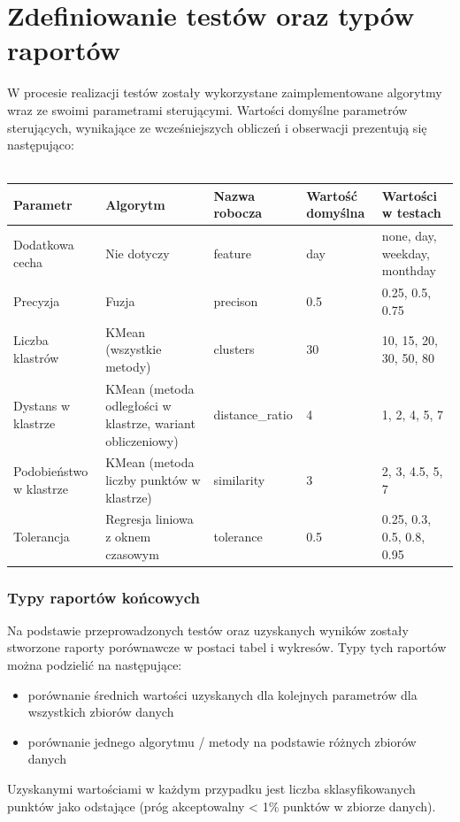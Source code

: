 \documentclass[eng,printmode]{mgr}
\begin{document}
\section{Zdefiniowanie testów oraz typów raportów}
W procesie realizacji testów zostały wykorzystane zaimplementowane algorytmy wraz ze swoimi parametrami sterującymi. Wartości domyślne parametrów sterujących, wynikające ze wcześniejszych obliczeń i obserwacji prezentują się następująco:
\\\\
\begingroup
\fontsize{10pt}{12pt}\selectfont
\begin{tabu} to 0.9\textwidth { | X[l] | X[l] | X[l] | X[l] | X[l] |}
\hline
\textbf{Parametr} & \textbf{Algorytm} & \textbf{Nazwa robocza} & \textbf{Wartość domyślna} & \textbf{Wartości w testach}\\
\hline
Dodatkowa cecha & Nie dotyczy & feature & day & none, day, weekday, monthday \\
\hline
Precyzja & Fuzja & precison &  0.5 & 0.25, 0.5, 0.75 \\
\hline
Liczba klastrów & KMean (wszystkie metody) & clusters & 30 & 10, 15, 20, 30, 50, 80\\
\hline
Dystans w klastrze & KMean (metoda odległości w klastrze, wariant obliczeniowy) & distance\_ratio & 4 & 1, 2, 4, 5, 7\\
\hline
Podobieństwo w klastrze & KMean (metoda liczby punktów w klastrze) & similarity & 3 & 2, 3, 4.5, 5, 7\\
\hline
Tolerancja & Regresja liniowa z oknem czasowym & tolerance & 0.5 & 0.25, 0.3, 0.5, 0.8, 0.95\\
\hline
\end{tabu}
\endgroup

\subsubsection{Typy raportów końcowych}
Na podstawie przeprowadzonych testów oraz uzyskanych wyników zostały stworzone raporty porównawcze w postaci tabel i wykresów. Typy tych raportów można podzielić na następujące:
\begin{itemize}
  \item porównanie średnich wartości uzyskanych dla kolejnych parametrów dla wszystkich zbiorów danych
  \item porównanie jednego algorytmu / metody na podstawie różnych zbiorów danych
\end{itemize}

Uzyskanymi wartościami w każdym przypadku jest liczba sklasyfikowanych punktów jako odstające (próg akceptowalny < 1\% punktów w zbiorze danych).
\end{document}
